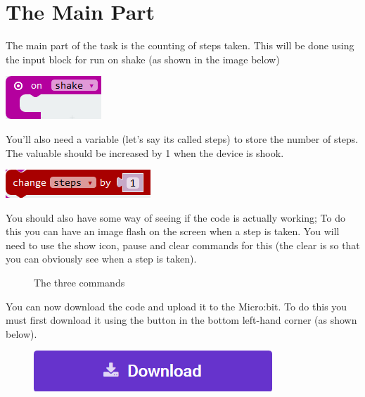 \documentclass{article}
\begin{document}
\section{The Main Part}
The main part of the task is the counting of steps taken. This will be done using the input block for run on shake (as shown in the image below)
\begin{center}
	\includegraphics[scale=1]{Onshake}
\end{center}
You'll also need a variable (let's say its called steps) to store the number of steps. The valuable should be increased by 1 when the device is shook.
\begin{center}
	\includegraphics[scale=1]{Steps}
\end{center}
You should also have some way of seeing if the code is actually working; To do this you can have an image flash on the screen when a step is taken. You will need to use the show icon, pause and clear commands for this (the clear is so that you can obviously see when a step is taken).
\begin{figure}[!hp]
  \centering
  \hfill
  \hfill
  \caption{The three commands}
\end{figure}
\newpage
You can now download the code and upload it to the Micro:bit. To do this you must first download it using the button in the bottom left-hand corner (as shown below).
\begin{figure}[!hp]
  \centering
    \includegraphics[scale=0.5]{download}
  \label{fig:download}
\end{figure}
\end{document}
